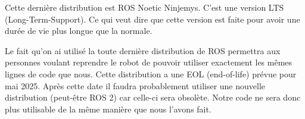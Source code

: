 Cette dernière distribution est ROS Noetic Ninjemys. C'est une version LTS (Long-Term-Support). Ce qui veut dire que cette version est faite pour avoir une durée de vie plus longue que la normale.\\


Le fait qu'on ai utilisé la toute dernière distribution de ROS permettra aux personnes voulant reprendre le robot de pouvoir utiliser exactement les mêmes lignes de code que nous. Cette distribution a une EOL (end-of-life) prévue pour mai 2025. Après cette date il faudra probablement utiliser une nouvelle distribution (peut-être ROS 2) car celle-ci sera obsolète. Notre code ne sera donc plus utilisable de la même manière que nous l'avons fait.